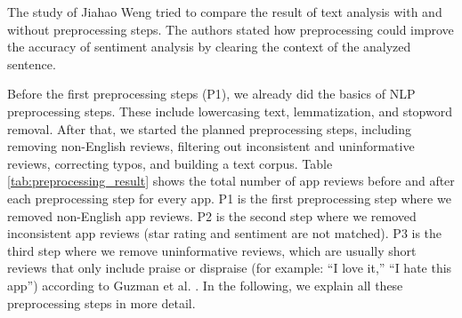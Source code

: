\documentclass[12pt]{article}
\begin{document}
The study of Jiahao Weng \cite{text_preprocessing_nlp_2} tried to compare the result of text analysis with and without preprocessing steps. The authors stated how preprocessing could improve the accuracy of sentiment analysis by clearing the context of the analyzed sentence.

Before the first preprocessing steps (P1), we already did the basics of NLP preprocessing steps. These include lowercasing text, lemmatization, and stopword removal. After that, we started the planned preprocessing steps, including removing non-English reviews, filtering out inconsistent and uninformative reviews, correcting typos, and building a text corpus. Table \ref{tab:preprocessing_result} shows the total number of app reviews before and after each preprocessing step for every app. P1 is the first preprocessing step where we removed non-English app reviews. P2 is the second step where we removed inconsistent app reviews (star rating and sentiment are not matched). P3 is the third step where we remove uninformative reviews, which are usually short reviews that only include praise or dispraise (for example: “I love it,” “I hate this app”) according to Guzman et al. \cite{fine_grained}. In the following, we explain all these preprocessing steps in more detail.
\end{document}
